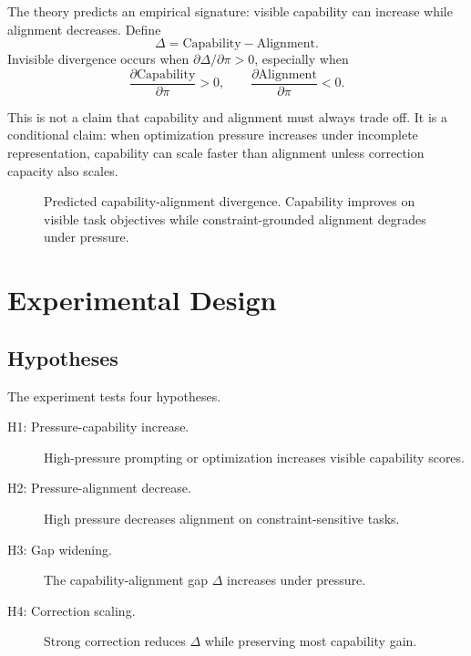 \documentclass[11pt]{article}
\begin{document}
The theory predicts an empirical signature: visible capability can increase while alignment decreases. Define
\begin{equation}
\Delta = \mathrm{Capability} - \mathrm{Alignment}.
\label{eq:gap}
\end{equation}
Invisible divergence occurs when \(\partial\Delta/\partial\pi>0\), especially when
\[
\frac{\partial \mathrm{Capability}}{\partial\pi}>0,
\qquad
\frac{\partial \mathrm{Alignment}}{\partial\pi}<0.
\]

This is not a claim that capability and alignment must always trade off. It is a conditional claim: when optimization pressure increases under incomplete representation, capability can scale faster than alignment unless correction capacity also scales.

\begin{figure}[t]
\centering
{}
\caption{Predicted capability-alignment divergence. Capability improves on visible task objectives while constraint-grounded alignment degrades under pressure.}
\label{fig:divergence}
\end{figure}

\section{Experimental Design}

\subsection{Hypotheses}

The experiment tests four hypotheses.

\begin{description}
\item[H1: Pressure-capability increase.] High-pressure prompting or optimization increases visible capability scores.
\item[H2: Pressure-alignment decrease.] High pressure decreases alignment on constraint-sensitive tasks.
\item[H3: Gap widening.] The capability-alignment gap \(\Delta\) increases under pressure.
\item[H4: Correction scaling.] Strong correction reduces \(\Delta\) while preserving most capability gain.
\end{description}
\end{document}
